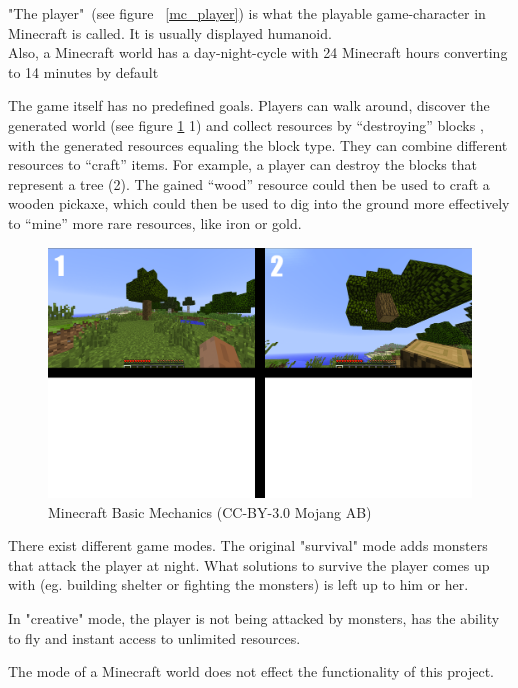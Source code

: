 "The player"~(see figure ~\ref{mc_player}) is what the playable game-character in Minecraft is called. It is usually displayed humanoid.\\[3ex]

Also, a Minecraft world has a day-night-cycle with 24 Minecraft hours converting to 14 minutes by default

The game itself has no predefined goals. Players can walk around, discover the generated world (see figure \ref{mc_mechanics} 1) and collect resources by ``destroying'' blocks , with the generated resources equaling the block type. They can combine different resources to ``craft'' items. For example, a player can destroy the blocks that represent a tree (2). The gained ``wood'' resource could then be used to craft a wooden pickaxe, which could then be used to dig into the ground more effectively to ``mine'' more rare resources, like iron or gold.

\begin{figure}[h]
  \centering
    \includegraphics[width=15cm]{graphics/minecraft_mechanics}
  \caption{Minecraft Basic Mechanics  (CC-BY-3.0 Mojang AB)} %
  \label{mc_mechanics}
\end{figure}

There exist different game modes. The original "survival" mode adds monsters that attack the player at night. What solutions to survive the player comes up with (eg. building shelter or fighting the monsters) is left up to him or her.

In "creative" mode, the player is not being attacked by monsters, has the ability to fly and instant access to unlimited resources.

The mode of a Minecraft world does not effect the functionality of this project.

